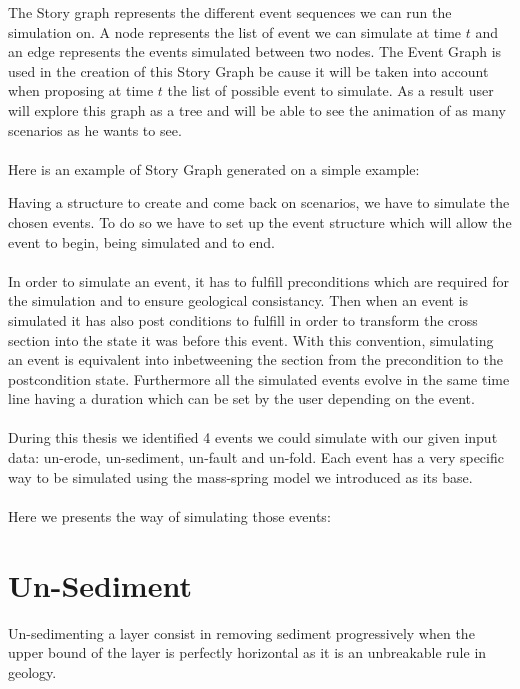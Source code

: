 \documentclass[12pt, a4paper]{memoir} %
\begin{document}
The Story graph represents the different event sequences we can run the simulation on. A node represents the list of event we can simulate at time $t$ and an edge represents the events simulated between two nodes. The Event Graph is used in the creation of this Story Graph be cause it will be taken into account when proposing at time $t$ the list of possible event to simulate. As a result user will explore this graph as a tree and will be able to see the animation of as many scenarios as he wants to see.\\\\

Here is an example of Story Graph generated on a simple example:


Having a structure to create and come back on scenarios, we have to simulate the chosen events. To do so we have to set up the event structure which will allow the event to begin, being simulated and to end.\\\\

In order to simulate an event, it has to fulfill preconditions which are required for the simulation and to ensure geological consistancy. Then when an event is simulated it has also post conditions to fulfill in order to transform the cross section into the state it was before this event. With this convention, simulating an event is equivalent into inbetweening the section from the precondition to the postcondition state. Furthermore all the simulated events evolve in the same time line having a duration which can be set by the user depending on the event.\\\\

During this thesis we identified 4 events we could simulate with our given input data: un-erode, un-sediment, un-fault and un-fold. Each event has a very specific way to be simulated using the mass-spring model we introduced as its base.\\\\

Here we presents the way of simulating those events:

\section{Un-Sediment}

Un-sedimenting a layer consist in removing sediment progressively when the upper bound of the layer is perfectly horizontal as it is an unbreakable rule in geology.\\\\
\end{document}
